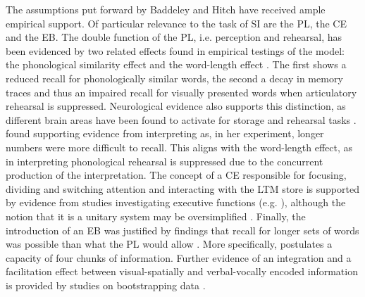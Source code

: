The assumptions put forward by Baddeley and Hitch have received ample empirical support. Of particular relevance to the task of SI are the PL, the CE and the EB. The double function of the PL, i.e. perception and rehearsal, has been evidenced by two related effects found in empirical testings of the model: the phonological similarity effect \citep{baddeley_is_2018} and the word-length effect \citep{baddeley_word_1975, jacquemot_is_2011}. The first shows a reduced recall for phonologically similar words, the second a decay in memory traces and thus an impaired recall for visually presented words when articulatory rehearsal is suppressed. Neurological evidence also supports this distinction, as different brain areas have been found to activate for storage and rehearsal tasks \citep{papagno_mapping_2017}. \citet{gieshoff_aus_2012} found supporting evidence from interpreting as, in her experiment, longer numbers were more difficult to recall. This aligns with the word-length effect, as in interpreting phonological rehearsal is suppressed due to the concurrent production of the interpretation. The concept of a CE responsible for focusing, dividing and switching attention and interacting with the LTM store is supported by evidence from studies investigating executive functions (e.g. \citealt{godefroy_dysexecutive_2010}), although the notion that it is a unitary system may be oversimplified \citep{stuss_is_2007,logie_retiring_2016}. Finally, the introduction of an EB was justified by findings that recall for longer sets of words was possible than what the PL would allow \citep{baddeley_sentence_1987}. More specifically, \citet{baddeley_working_2012} postulates a capacity of four chunks of information. Further evidence of an integration and a facilitation effect between visual-spatially and verbal-vocally encoded information is provided by studies on bootstrapping data \citep{darling_visuospatial_2017,darling_visuospatial_2010}.

